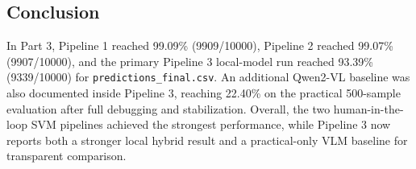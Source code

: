 \subsection{Conclusion}
In Part 3, Pipeline 1 reached 99.09\% (9909/10000), Pipeline 2 reached 99.07\% (9907/10000), and the primary Pipeline 3 local-model run reached 93.39\% (9339/10000) for \texttt{predictions\_final.csv}. An additional Qwen2-VL baseline was also documented inside Pipeline 3, reaching 22.40\% on the practical 500-sample evaluation after full debugging and stabilization. Overall, the two human-in-the-loop SVM pipelines achieved the strongest performance, while Pipeline 3 now reports both a stronger local hybrid result and a practical-only VLM baseline for transparent comparison.